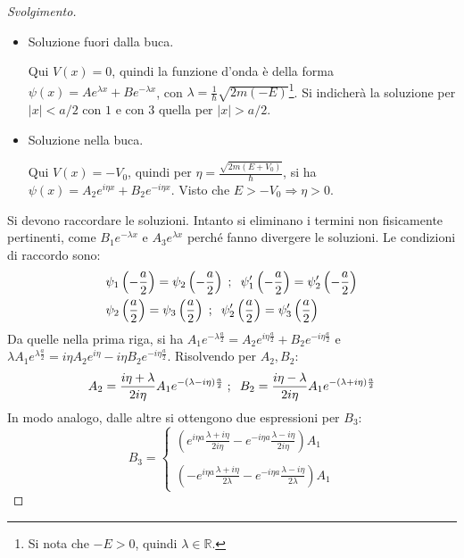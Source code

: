 \documentclass[11pt, a4paper]{scrartcl} %
\numberwithin{equation}{subsection}
\theoremstyle{style2}
\theoremstyle{style1}
\renewcommand\qedsymbol{$\blacksquare$}
\newenvironment{svolgimento}{\renewcommand\qedsymbol{$\spadesuit$}\begin{proof}[Svolgimento]}{\end{proof}}
\begin{document}
\begin{svolgimento}
\begin{itemize}
	\item Soluzione fuori dalla buca.

		Qui $V(x) =0$, quindi la funzione d'onda \`e della forma $\psi (x) = Ae^{\lambda x} + B e^{-\lambda x} $, con $\lambda  = \frac{1}{\hbar } \sqrt{2m(-E)} $\footnote{Si nota che $-E > 0$, quindi $\lambda \in \mathbb{R}$.}. Si indicher\`a la soluzione per $\lvert x \rvert < a /2 $ con $1$ e con $3$ quella per $\lvert x \rvert > a / 2$.
	\item Soluzione nella buca.

		Qui $V(x) = - V_0$, quindi per $\eta = \frac{\sqrt{2m (E+V_0)} }{\hbar }$, si ha $\psi (x) = A_2e^{i\eta x}  + B_2 e^{-i\eta x} $. Visto che $E>-V_0\Rightarrow \eta>0$.
\end{itemize}
Si devono raccordare le soluzioni. Intanto si eliminano i termini non fisicamente pertinenti, come $B_1 e^{- \lambda x} $ e $A_3 e^{\lambda  x} $ perch\'e fanno divergere le soluzioni. Le condizioni di raccordo sono:
\[
\begin{split}
	&\psi _1\left(-\frac{a}{2}\right) = \psi _2 \left(-\frac{a}{2}\right) \hspace{.1cm}; \hspace{.2cm}\psi _1'\left(-\frac{a}{2}\right) = \psi _2 '\left(-\frac{a}{2}\right) \\
	&\psi _2\left(\frac{a}{2}\right) = \psi _3 \left(\frac{a}{2}\right) \hspace{.1cm}; \hspace{.2cm}\psi _2'\left(\frac{a}{2}\right) = \psi _3 '\left(\frac{a}{2}\right) 
\end{split}
\] 
Da quelle nella prima riga, si ha $A_1 e^{- \lambda  \frac{a}{2}} = A_2 e^{i\eta \frac{a}{2}} + B_2 e^{-i\eta \frac{a}{2}} $ e $\lambda  A_1 e^{ \lambda  \frac{a}{2}} = i\eta A_2 e^{i\eta }  - i\eta B_2 e^{-i\eta \frac{a}{2}} $. Risolvendo per $A_2,B_2$:
\[
	A_2 = \frac{i\eta +\lambda }{2 i\eta }A_1 e^{- (\lambda -i\eta) \frac{a}{2}} \hspace{.1cm} ; \hspace{.2cm} B_2 = \frac{i\eta -\lambda }{2 i\eta }A_1 e^{- (\lambda +i\eta) \frac{a}{2}} 
\] 
In modo analogo, dalle altre si ottengono due espressioni per $B_3$:
\[
B_3 = \begin{cases}
	\displaystyle \left(e^{i\eta a }\frac{\lambda + i\eta}{2 i \eta} - e^{-i\eta a } \frac{\lambda  - i\eta}{2i\eta}\right) A_1 \\
	\\
	\displaystyle \left(-e^{i\eta a } \frac{\lambda + i\eta}{2 \lambda }- e^{-i\eta a } \frac{\lambda  - i\eta}{2\lambda }\right) A_1 

\end{cases}\]
\end{svolgimento}
\end{document}
